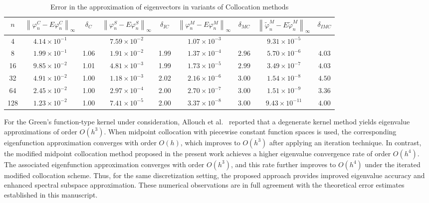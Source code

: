 \documentclass[pdflatex, sn-mathphys-num]{sn-jnl}%
\newcommand{\norm}[1]{\left\lVert #1\right\rVert}
\theoremstyle{thmstyleone}%
\theoremstyle{thmstyletwo}%
\theoremstyle{thmstylethree}%
\begin{document}
\begin{table}[h!]
	\footnotesize
	\centering
		\setlength{\tabcolsep}{4pt}
	\renewcommand{\arraystretch}{1.2}
	\caption{Error in the approximation of eigenvectors in variants of Collocation methods}
	\label{table:03Col1}
	\begin{tabular}{|c|cc|cc|cc|cc|}
		\hline
	$n$ & $\norm{\varphi_n^C - E \varphi_n^C }_\infty$ & $\delta_C$ 
	& $\norm{\varphi_n^S - E \varphi_n^S }_\infty$ & $\delta_{IC}$ 
	& $\norm{\varphi_n^M - E \varphi_n^M }_\infty$ & $\delta_{MC}$ 
	& $\norm{\widetilde{\varphi}_n^M - E \widetilde{\varphi}_n^M }_\infty$ & $\delta_{IMC}$ \\[3.5pt]
		\hline
		4   & $4.14\times10^{-1}$ &    & $7.59\times10^{-2}$ &  & $1.07\times10^{-3}$ &  & $9.31\times10^{-5}$ &  \\[3.5pt]
		8   & $1.99\times10^{-1}$ & 1.06 & $1.91\times10^{-2}$ & 1.99 & $1.37\times10^{-4}$ & $2.96$ & $5.70\times10^{-6}$ & $4.03$ \\[3.5pt]
		16  & $9.85\times10^{-2}$ & 1.01 & $4.81\times10^{-3}$ & 1.99 & $1.73\times10^{-5}$ & $2.99$ & $3.49\times10^{-7}$ & $4.03$ \\[3.5pt]
		32  & $4.91\times10^{-2}$ & 1.00 & $1.18\times10^{-3}$ & 2.02 & $2.16\times10^{-6}$ & $3.00$ & $1.54\times10^{-8}$ & $4.50$ \\[3.5pt]
		64  & $2.45\times10^{-2}$ & 1.00 & $2.97\times10^{-4}$ & 2.00 & $2.70\times10^{-7}$ & $3.00$ & $1.51\times10^{-9}$ & $3.36$ \\[3.5pt]
		128 & $1.23\times10^{-2}$ & 1.00 & $7.41\times10^{-5}$ & 2.00 & $3.37\times10^{-8}$ & $3.00$ & $9.43\times10^{-11}$ & $4.00$ \\[3.5pt]
		\hline
	\end{tabular}
\end{table}




\noindent

For the Green's function-type kernel under consideration, Allouch et al.~\cite{CA-PS-DS-MT} reported that a degenerate kernel method yields eigenvalue approximations  of order $O(h^{3})$. When midpoint collocation with piecewise constant function spaces is used, the corresponding eigenfunction approximation converges with order $O(h)$, which improves to $O(h^{3})$ after applying an iteration technique. In contrast, the modified midpoint collocation method proposed in the present work achieves a higher eigenvalue convergence rate of order $O(h^{4})$. The associated eigenfunction approximation converges with order $O(h^{3})$, and this rate further improves to $O(h^{4})$ under the iterated modified collocation scheme. Thus, for the same discretization setting, the proposed approach provides improved eigenvalue accuracy and enhanced spectral subspace approximation. These numerical observations are in full agreement with the theoretical error estimates established in this manuscript.
	
\end{document}
